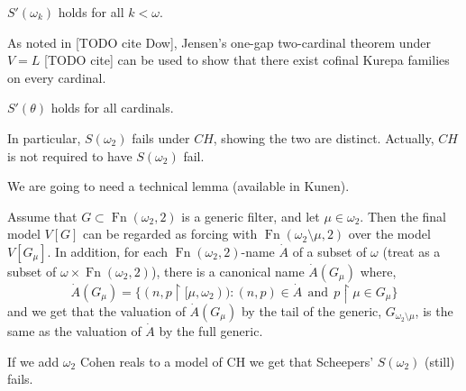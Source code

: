 \documentclass[11pt]{article}
\begin{document}
  \begin{corollary}
    \(S'(\omega_k)\) holds for all \(k<\omega\).
  \end{corollary}

  As noted in [TODO cite Dow],
  Jensen's one-gap two-cardinal theorem under \(V=L\) [TODO cite] can be used
  to show that there exist cofinal Kurepa families on every cardinal.

  \begin{corollary}[\(V=L\)]
    \(S'(\theta)\) holds for all cardinals.
  \end{corollary}

  In particular, \(S(\omega_2)\) fails under \(CH\), showing the two are
  distinct. Actually, \(CH\) is not required to have \(S(\omega_2)\) fail.


        We are going to need a technical lemma (available in Kunen).
        \bigskip

        \begin{lemma}
        Assume that $G\subset \operatorname{Fn}(\omega_2,2)$ is a generic filter,
         and let $\mu\in \omega_2$. Then the final model $V[G]$ can be
         regarded as forcing  with $\operatorname{Fn}(\omega_2\setminus \mu,
         2)$ over the model $V[G_\mu]$.
        In addition, for each $\operatorname{Fn}(\omega_2,2)$-name $\dot A$
        of a subset of $\omega$ (treat as a subset of $\omega\times
        \operatorname{Fn}(\omega_2,2) $),
        there is a canonical name $\dot A(G_\mu)$ where,
        $$\dot A(G_\mu) = \{ (n,p\restriction [\mu,\omega_2))  :
         (n,p)\in \dot A\ \ \mbox{and} \ \ p\restriction \mu\in G_\mu\}$$
        and we get that the valuation of $\dot A(G_\mu)$ by the tail
        of the generic, $G_{\omega_2\setminus \mu}$, is the same as
        the valuation of $\dot A$ by the full generic.
        \end{lemma}


        \begin{theorem}
          If we add $\omega_2$ Cohen reals to a model of CH we get
        that Scheepers' $S(\omega_2)$ (still) fails.
        \end{theorem}
\end{document}
